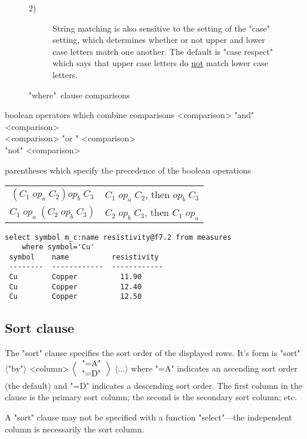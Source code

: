 \documentclass[11pt,a4paper]{report}
\def\opt#1{$\langle \mbox{#1} \rangle$}
\def\Opt#1{$\Bigl\langle \mbox{#1} \Bigr\rangle$}
\def\stk#1{\begin{tabular}[c]{c}#1\end{tabular}}
\def\I{\index}
\begin{document}
\begin{List}
\begin{figure}[p]
\begin{description}
 \item[2)] String matching is also sensitive to the setting of the
 "case" setting, which determines whether or not upper
 and lower case letters match one another.  The default
 is "case respect" which says that upper case letters
 do \underline{not} match lower case letters.
\end{description}
\caption{"where"\ clause comparisons}
\label{op-test}
\end{figure}
 
 \item[boolean operators] which combine comparisons
   <comparison> "and" <comparison> \\
                <comparison> "or " <comparison> \\
           \phantom{<comparison>} "not" <comparison>
 
 \item[parentheses] which specify the precedence
   of the boolean operations
 
     \begin{tabular}{cl}
     $(C_1\; op_a\; C_2) op_b\; C_3$&
        $C_1\; op_a\; C_2$, then $ op_b\; C_3$\\
     $C_1\; op_a\; (C_2\; op_b\; C_3)$&
        $C_2\; op_b\; C_3$, then $ C_1\; op_a$
     \end{tabular}
\end{List}

\begin{verbatim}
select symbol m_c:name resistivity@f7.2 from measures
    where symbol='Cu'
 symbol    name          resistivity
 --------  ------------  ------------
 Cu        Copper          11.90
 Cu        Copper          12.40
 Cu        Copper          12.50
\end{verbatim}
 
\subsection{Sort clause}
%
\I{sort@<sort clause>}
\label{sort-clause}
The "sort" clause specifies the sort order of the displayed
rows.
It's form is
"sort" \opt{"by"}
  <column> \Opt{\stk{"=A"\\"=D"}} \opt{\ldots}
where "=A" indicates an ascending sort order (the default)
and "=D" indicates a descending sort order.
The first column in the clause is the primary sort column;
the second is the secondary sort column; etc.
 
A "sort" clause may not be specified with a function "select"---the
independent column is necessarily the sort column.
 
\end{document}
